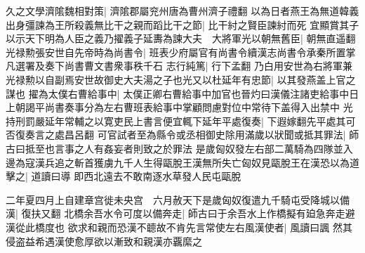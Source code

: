 久之文學濟隂魏相對策|{
	濟隂郡屬兖州唐為曹州濟子禮翻}
以為日者燕王為無道韓義出身彊諫為王所殺義無比干之親而蹈比干之節|{
	比干紂之賢臣諫紂而死}
宜顯賞其子以示天下明為人臣之義乃擢義子延夀為諫大夫　大將軍光以朝無舊臣|{
	朝無直遥翻}
光禄勲張安世自先帝時為尚書令|{
	班表少府屬官有尚書令續漢志尚書令承秦所置掌凡選署及奏下尚書曹文書衆事秩千石}
志行純篤|{
	行下孟翻}
乃白用安世為右將軍兼光禄勲以自副焉安世故御史大夫湯之子也光又以杜延年有忠節|{
	以其發燕盖上官之謀也}
擢為太僕右曹給事中|{
	太僕正卿右曹給事中加官也晉灼曰漢儀注諸吏給事中日上朝謁平尚書奏事分為左右曹班表給事中掌顧問慮對位中常待下盖得入出禁中}
光持刑罰嚴延年常輔之以寛吏民上書言便宜輒下延年平處復奏|{
	下遐嫁翻先平處其可否復奏言之處昌呂翻}
可官試者至為縣令或丞相御史除用滿歲以狀聞或抵其罪法|{
	師古曰抵至也言事之人有姦妄者則致之於罪法}
是歲匈奴發左右部二萬騎為四隊並入邊為寇漢兵追之斬首獲虜九千人生得甌脫王漢無所失亡匈奴見甌脫王在漢恐以為道擊之|{
	道讀曰導}
即西北遠去不敢南逐水草發人民屯甌脫

二年夏四月上自建章宫徙未央宫　六月赦天下是歲匈奴復遣九千騎屯受降城以備漢|{
	復扶又翻}
北橋余吾水令可度以備奔走|{
	師古曰于余吾水上作橋擬有廹急奔走避漢從此橋度也}
欲求和親而恐漢不聼故不肯先言常使左右風漢使者|{
	風讀曰諷}
然其侵盗益希遇漢使愈厚欲以漸致和親漢亦覊縻之

